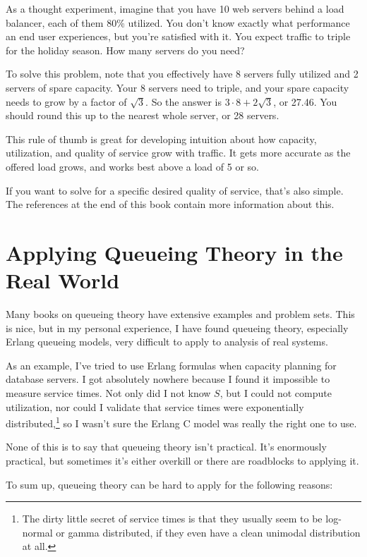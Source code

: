 \documentclass{vivid_layout}
\begin{document}
As a thought experiment, imagine that you have 10 web servers behind a load
balancer, each of them 80\% utilized. You don't know exactly what performance an
end user experiences, but you're satisfied with it. You expect traffic to triple
for the holiday season. How many servers do you need?

To solve this problem, note that you effectively have 8 servers fully utilized
and 2 servers of spare capacity. Your 8 servers need to triple, and your spare
capacity needs to grow by a factor of \( \sqrt{3} \). So the answer is \(
3\cdot8 + 2\sqrt{3} \), or 27.46. You should round this up to the nearest whole
server, or 28 servers.

This rule of thumb is great for developing intuition about how capacity,
utilization, and quality of service grow with traffic. It gets more accurate as
the offered load grows, and works best above a load of 5 or so.

If you want to solve for a specific desired quality of service, that's also
simple. The references at the end of this book contain more information about
this.

\section{Applying Queueing Theory in the Real World}

Many books on queueing theory have extensive examples and problem sets. This is nice, but in my personal experience, I have found queueing theory, especially Erlang queueing models, very difficult to apply to analysis of real systems.

As an example, I've tried to use Erlang formulas when capacity planning for database servers. I got absolutely nowhere because I found it impossible to measure service times. Not only did I not know $S$, but I could not compute utilization, nor could I validate that service times were exponentially distributed,\footnote{The dirty little secret of service times is that they usually seem to be log-normal or gamma distributed, if they even have a clean unimodal distribution at all.} so I wasn't sure the Erlang C model was really the right one to use.

None of this is to say that queueing theory isn't practical. It's enormously practical, but sometimes it's either overkill or there are roadblocks to applying it.

To sum up, queueing theory can be hard to apply for the following reasons:
\end{document}
